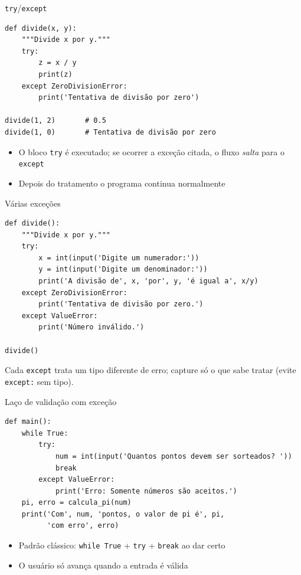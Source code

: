 \documentclass[aspectratio=169,10pt,t]{beamer}
\begin{document}
\begin{frame}[fragile]{\texttt{try}/\texttt{except}}
\begin{lstlisting}
def divide(x, y):
    """Divide x por y."""
    try:
        z = x / y
        print(z)
    except ZeroDivisionError:
        print('Tentativa de divisão por zero')

divide(1, 2)       # 0.5
divide(1, 0)       # Tentativa de divisão por zero
\end{lstlisting}
  \begin{itemize}
    \item O bloco \texttt{try} é executado; se ocorrer a exceção citada, o fluxo \emph{salta} para o \texttt{except}
    \item Depois do tratamento o programa continua normalmente
  \end{itemize}
\end{frame}

\begin{frame}[fragile]{Várias exceções}
\begin{lstlisting}
def divide():
    """Divide x por y."""
    try:
        x = int(input('Digite um numerador:'))
        y = int(input('Digite um denominador:'))
        print('A divisão de', x, 'por', y, 'é igual a', x/y)
    except ZeroDivisionError:
        print('Tentativa de divisão por zero.')
    except ValueError:
        print('Número inválido.')

divide()
\end{lstlisting}
  \small Cada \texttt{except} trata um tipo diferente de erro; capture só o que sabe tratar (evite \texttt{except:} sem tipo).\\
\end{frame}

\begin{frame}[fragile]{Laço de validação com exceção}
\begin{lstlisting}
def main():
    while True:
        try:
            num = int(input('Quantos pontos devem ser sorteados? '))
            break
        except ValueError:
            print('Erro: Somente números são aceitos.')
    pi, erro = calcula_pi(num)
    print('Com', num, 'pontos, o valor de pi é', pi,
          'com erro', erro)
\end{lstlisting}
  \begin{itemize}
    \item Padrão clássico: \texttt{while True} + \texttt{try} + \texttt{break} ao dar certo
    \item O usuário só avança quando a entrada é válida
  \end{itemize}
\end{frame}
\end{document}
